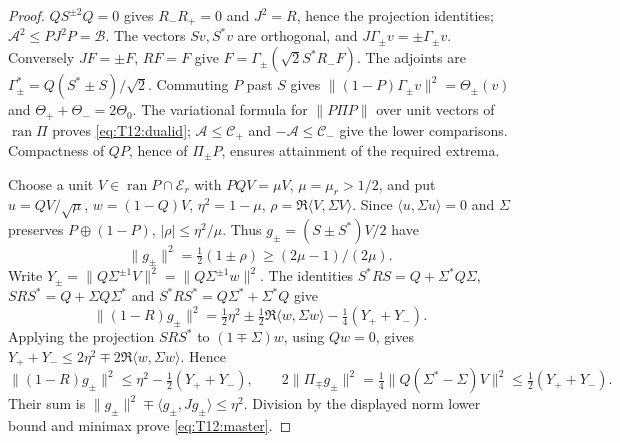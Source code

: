 \begin{proof}
$QS^{\pm2}Q=0$ gives $R_-R_+=0$ and $J^2=R$, hence the projection
identities; $\mathcal A^2\le PJ^2P=\mathcal B$.
The vectors $Sv,S^*v$ are orthogonal, and $J\Gamma_\pm v=\pm\Gamma_\pm v$.
Conversely $JF=\pm F$, $RF=F$ give
$F=\Gamma_\pm(\sqrt2 S^*R_-F)$.
The adjoints are $\Gamma_\pm^*=Q(S^*\pm S)/\sqrt2$.
Commuting $P$ past $S$ gives
$\|(1-P)\Gamma_\pm v\|^2=\Theta_\pm(v)$ and
$\Theta_++\Theta_-=2\Theta_0$.
The variational formula for $\|P\Pi P\|$ over unit vectors of
$\operatorname{ran}\Pi$ proves \eqref{eq:T12:dualid};
$\mathcal A\le\mathcal C_+$ and $-\mathcal A\le\mathcal C_-$
give the lower comparisons. Compactness of $QP$, hence of
$\Pi_\pm P$, ensures attainment of the required extrema.

Choose a unit $V\in\operatorname{ran}P\cap\mathcal E_r$ with
$PQV=\mu V$, $\mu=\mu_r>1/2$, and put $u=QV/\sqrt\mu$,
$w=(1-Q)V$, $\eta^2=1-\mu$, $\rho=\Re\langle V,\Sigma V\rangle$.
Since $\langle u,\Sigma u\rangle=0$ and $\Sigma$ preserves $P\oplus(1-P)$,
$|\rho|\le\eta^2/\mu$. Thus $g_\pm=(S\pm S^*)V/2$ have
\[
 \|g_\pm\|^2=\tfrac12(1\pm\rho)\ge(2\mu-1)/(2\mu).
\]
Write $Y_\pm=\|Q\Sigma^{\pm1}V\|^2=\|Q\Sigma^{\pm1}w\|^2$.
The identities
$S^*RS=Q+\Sigma^*Q\Sigma$, $SRS^*=Q+\Sigma Q\Sigma^*$ and
$S^*RS^*=Q\Sigma^*+\Sigma^*Q$ give
\[
 \|(1-R)g_\pm\|^2
 =\tfrac12\eta^2\pm\tfrac12\Re\langle w,\Sigma w\rangle
       -\tfrac14(Y_++Y_-).
\]
Applying the projection $SRS^*$ to $(1\mp\Sigma)w$, using $Qw=0$,
gives $Y_++Y_-\le2\eta^2\mp2\Re\langle w,\Sigma w\rangle$.
Hence
\[
 \|(1-R)g_\pm\|^2\le\eta^2-\tfrac12(Y_++Y_-),\qquad
 2\|\Pi_\mp g_\pm\|^2
 =\tfrac14\|Q(\Sigma^*-\Sigma)V\|^2\le\tfrac12(Y_++Y_-).
\]
Their sum is
$\|g_\pm\|^2\mp\langle g_\pm,Jg_\pm\rangle\le\eta^2$.
Division by the displayed norm lower bound and minimax prove
\eqref{eq:T12:master}.
\end{proof}


